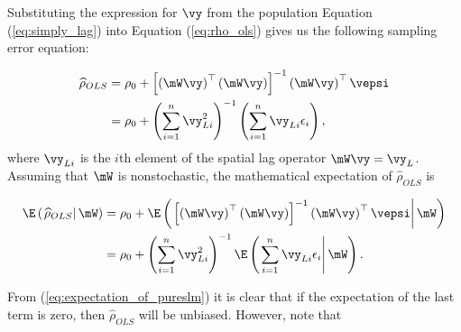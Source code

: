 \documentclass[english,12pt]{book}\usepackage[]{graphicx}\usepackage[]{xcolor}
\begin{document}
Substituting the expression for $\vy$ from the population Equation (\ref{eq:simply_lag}) into Equation (\ref{eq:rho_ols}) gives us the following sampling error equation:

\begin{equation*}
  \begin{aligned}
          \widehat{\rho}_{OLS} & = \rho_0 + \left[\left(\mW\vy \right)^\top\left(\mW\vy \right)\right]^{-1}\left(\mW\vy \right)^\top\vepsi \\
                               & = \rho_0 + \left(\sum_{i = 1}^n \vy_{Li}^2\right)^{-1}\left(\sum_{i = 1}^{n}\vy_{Li}\epsilon_i\right),
  \end{aligned}
\end{equation*}
%
where $\vy_{Li}$ is the $i$th element of the spatial lag operator $\mW\vy = \vy_L$. Assuming that $\mW$ is nonstochastic, the mathematical expectation of $\widehat{\rho}_{OLS}$ is

\begin{equation}\label{eq:expectation_of_pureslm}
  \begin{aligned}
\E\left(\left.\widehat{\rho}_{OLS}\right| \mW\right) & = \rho_0 + \E\left(\left.\left[\left(\mW\vy \right)^\top\left(\mW\vy \right)\right]^{-1}\left(\mW\vy \right)^\top\vepsi\right| \mW \right) \\
                         & = \rho_0 + \left(\sum_{i = 1}^n \vy_{Li}^2\right)^{-1}\E\left(\left.\sum_{i = 1}^{n}\vy_{Li}\epsilon_i\right| \mW\right).
  \end{aligned}
\end{equation}

From (\ref{eq:expectation_of_pureslm}) it is clear that if the expectation of the last term is zero, then $\widehat{\rho}_{OLS}$ will be unbiased. However, note that
\end{document}
